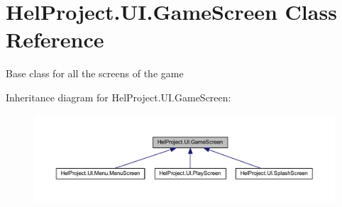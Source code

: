 \hypertarget{class_hel_project_1_1_u_i_1_1_game_screen}{}\section{Hel\+Project.\+U\+I.\+Game\+Screen Class Reference}
\label{class_hel_project_1_1_u_i_1_1_game_screen}


Base class for all the screens of the game  




Inheritance diagram for Hel\+Project.\+U\+I.\+Game\+Screen\+:
\nopagebreak
\begin{figure}[H]
\begin{center}
\leavevmode
\includegraphics[width=350pt]{class_hel_project_1_1_u_i_1_1_game_screen__inherit__graph}
\end{center}
\end{figure}
